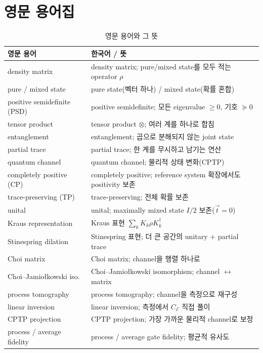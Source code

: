 \documentclass[11pt,a4paper]{article}
\newcommand{\E}{\mathcal{E}}
\theoremstyle{definition}
\theoremstyle{plain}
\theoremstyle{remark}
\begin{document}
\section{영문 용어집}

\begin{longtable}{p{}p{}}
\caption{영문 용어와 그 뜻}\\
\toprule
영문 용어 & 한국어 / 뜻 \\
\midrule
\endhead
density matrix & density matrix; pure/mixed state를 모두 적는 operator $\rho$ \\
pure / mixed state & pure state(벡터 하나) / mixed state(확률 혼합) \\
positive semidefinite (PSD) & positive semidefinite; 모든 eigenvalue $\ge0$, 기호 $\succeq0$ \\
tensor product & tensor product $\otimes$; 여러 계를 하나로 합침 \\
entanglement & entanglement; 곱으로 분해되지 않는 joint state \\
partial trace & partial trace; 한 계를 무시하고 남기는 연산 \\
quantum channel & quantum channel; 물리적 상태 변화(CPTP) \\
completely positive (CP) & completely positive; reference system 확장에서도 positivity 보존 \\
trace-preserving (TP) & trace-preserving; 전체 확률 보존 \\
unital & unital; maximally mixed state $I/2$ 보존($\vec t=0$) \\
Kraus representation & Kraus 표현 $\sum_k K_k\rho K_k^\dagger$ \\
Stinespring dilation & Stinespring 표현; 더 큰 공간의 unitary $+$ partial trace \\
Choi matrix & Choi matrix; channel을 행렬 하나로 \\
Choi--Jamio{\l}kowski iso. & Choi--Jamio{\l}kowski isomorphism; channel $\leftrightarrow$ matrix \\
process tomography & process tomography; channel을 측정으로 재구성 \\
linear inversion & linear inversion; 측정에서 $C_\E$ 직접 풀이 \\
CPTP projection & CPTP projection; 가장 가까운 물리적 channel로 보정 \\
process / average fidelity & process / average gate fidelity; 평균적 유사도 \\

\end{longtable}
\end{document}
